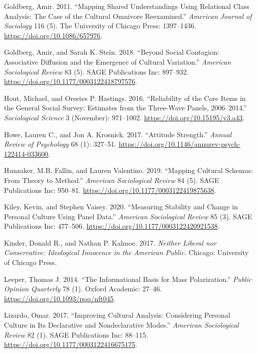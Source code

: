 \documentclass[12pt,]{article}
\begin{document}
\leavevmode\hypertarget{ref-goldberg2011}{}%
Goldberg, Amir. 2011. ``Mapping Shared Understandings Using Relational Class Analysis: The Case of the Cultural Omnivore Reexamined.'' \emph{American Journal of Sociology} 116 (5). The University of Chicago Press: 1397--1436. \url{https://doi.org/10.1086/657976}.

\leavevmode\hypertarget{ref-goldberg2018}{}%
Goldberg, Amir, and Sarah K. Stein. 2018. ``Beyond Social Contagion: Associative Diffusion and the Emergence of Cultural Variation.'' \emph{American Sociological Review} 83 (5). SAGE Publications Inc: 897--932. \url{https://doi.org/10.1177/0003122418797576}.

\leavevmode\hypertarget{ref-hout2016}{}%
Hout, Michael, and Orestes P. Hastings. 2016. ``Reliability of the Core Items in the General Social Survey: Estimates from the Three-Wave Panels, 2006--2014.'' \emph{Sociological Science} 3 (November): 971--1002. \url{https://doi.org/10.15195/v3.a43}.

\leavevmode\hypertarget{ref-howe2017}{}%
Howe, Lauren C., and Jon A. Krosnick. 2017. ``Attitude Strength.'' \emph{Annual Review of Psychology} 68 (1): 327--51. \url{https://doi.org/10.1146/annurev-psych-122414-033600}.

\leavevmode\hypertarget{ref-hunzaker2019}{}%
Hunzaker, M.B. Fallin, and Lauren Valentino. 2019. ``Mapping Cultural Schemas: From Theory to Method.'' \emph{American Sociological Review} 84 (5). SAGE Publications Inc: 950--81. \url{https://doi.org/10.1177/0003122419875638}.

\leavevmode\hypertarget{ref-kiley2020}{}%
Kiley, Kevin, and Stephen Vaisey. 2020. ``Measuring Stability and Change in Personal Culture Using Panel Data.'' \emph{American Sociological Review} 85 (3). SAGE Publications Inc: 477--506. \url{https://doi.org/10.1177/0003122420921538}.

\leavevmode\hypertarget{ref-kinder2017}{}%
Kinder, Donald R., and Nathan P. Kalmoe. 2017. \emph{Neither Liberal nor Conservative: Ideological Innocence in the American Public}. Chicago: University of Chicago Press.

\leavevmode\hypertarget{ref-leeper2014}{}%
Leeper, Thomas J. 2014. ``The Informational Basis for Mass Polarization.'' \emph{Public Opinion Quarterly} 78 (1). Oxford Academic: 27--46. \url{https://doi.org/10.1093/poq/nft045}.

\leavevmode\hypertarget{ref-lizardo2017}{}%
Lizardo, Omar. 2017. ``Improving Cultural Analysis: Considering Personal Culture in Its Declarative and Nondeclarative Modes.'' \emph{American Sociological Review} 82 (1). SAGE Publications Inc: 88--115. \url{https://doi.org/10.1177/0003122416675175}.
\end{document}
